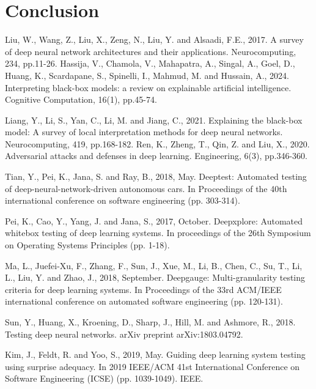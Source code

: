 \documentclass[10pt, conference, a4paper, final]{IEEEtran}
\begin{document}
\section{Conclusion}

\begin{thebibliography}{01}

    Liu, W., Wang, Z., Liu, X., Zeng, N., Liu, Y. and Alsaadi, F.E., 2017. A survey of deep neural network architectures and their applications. Neurocomputing, 234, pp.11-26.
    Hassija, V., Chamola, V., Mahapatra, A., Singal, A., Goel, D., Huang, K., Scardapane, S., Spinelli, I., Mahmud, M. and Hussain, A., 2024. Interpreting black-box models: a review on explainable artificial intelligence. Cognitive Computation, 16(1), pp.45-74.

     Liang, Y., Li, S., Yan, C., Li, M. and Jiang, C., 2021. Explaining the black-box model: A survey of local interpretation methods for deep neural networks. Neurocomputing, 419, pp.168-182.
    Ren, K., Zheng, T., Qin, Z. and Liu, X., 2020. Adversarial attacks and defenses in deep learning. Engineering, 6(3), pp.346-360.

    Tian, Y., Pei, K., Jana, S. and Ray, B., 2018, May. Deeptest: Automated testing of deep-neural-network-driven autonomous cars. In Proceedings of the 40th international conference on software engineering (pp. 303-314).
    
     Pei, K., Cao, Y., Yang, J. and Jana, S., 2017, October. Deepxplore: Automated whitebox testing of deep learning systems. In proceedings of the 26th Symposium on Operating Systems Principles (pp. 1-18).

    Ma, L., Juefei-Xu, F., Zhang, F., Sun, J., Xue, M., Li, B., Chen, C., Su, T., Li, L., Liu, Y. and Zhao, J., 2018, September. Deepgauge: Multi-granularity testing criteria for deep learning systems. In Proceedings of the 33rd ACM/IEEE international conference on automated software engineering (pp. 120-131).
    
    Sun, Y., Huang, X., Kroening, D., Sharp, J., Hill, M. and Ashmore, R., 2018. Testing deep neural networks. arXiv preprint arXiv:1803.04792.

    Kim, J., Feldt, R. and Yoo, S., 2019, May. Guiding deep learning system testing using surprise adequacy. In 2019 IEEE/ACM 41st International Conference on Software Engineering (ICSE) (pp. 1039-1049). IEEE.
  

\end{thebibliography}
\end{document}
